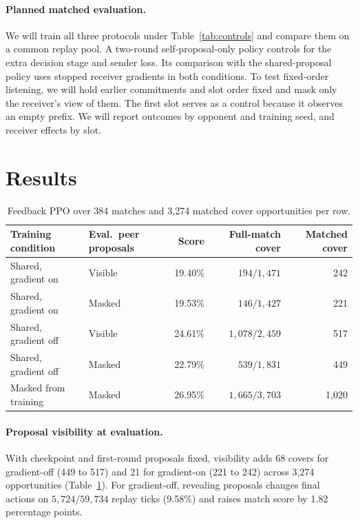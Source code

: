 \documentclass{article}
\begin{document}
\paragraph{Planned matched evaluation.}
We will train all three protocols under Table~\ref{tab:controls} and compare them on a common replay pool. A two-round self-proposal-only policy controls for the extra decision stage and sender loss. Its comparison with the shared-proposal policy uses stopped receiver gradients in both conditions. To test fixed-order listening, we will hold earlier commitments and slot order fixed and mask only the receiver's view of them. The first slot serves as a control because it observes an empty prefix. We will report outcomes by opponent and training seed, and receiver effects by slot.

\section{Results}
\label{sec:results}

\begin{table}[H]
  \centering
  \caption{Feedback PPO over 384 matches and 3,274 matched cover opportunities per row.}
  \label{tab:feedback}
  \begin{tabular*}{\linewidth}{@{\extracolsep{\fill}}llrrr@{}}
    \toprule
    Training condition & Eval.\ peer proposals & Score & Full-match cover & Matched cover \\
    \midrule
    Shared, gradient on  & Visible & 19.40\% & \(194/1{,}471\)   & 242 \\
    Shared, gradient on  & Masked  & 19.53\% & \(146/1{,}427\)   & 221 \\
    Shared, gradient off & Visible & 24.61\% & \(1{,}078/2{,}459\) & 517 \\
    Shared, gradient off & Masked  & 22.79\% & \(539/1{,}831\)   & 449 \\
    Masked from training & Masked  & 26.95\% & \(1{,}665/3{,}703\) & 1{,}020 \\
    \bottomrule
  \end{tabular*}
\end{table}

\paragraph{Proposal visibility at evaluation.}
With checkpoint and first-round proposals fixed, visibility adds 68 covers for gradient-off (449 to 517) and 21 for gradient-on (221 to 242) across 3,274 opportunities (Table~\ref{tab:feedback}). For gradient-off, revealing proposals changes final actions on \(5{,}724/59{,}734\) replay ticks (9.58\%) and raises match score by 1.82 percentage points.
\end{document}
